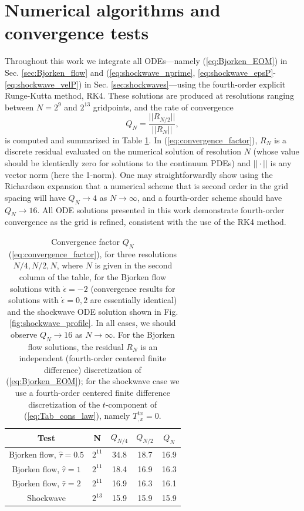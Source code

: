 \documentclass[%
notitlepage,
superscriptaddress,
nofootinbib,
amsmath,
amssymb,
aps,
twocolumn
]{revtex4-1}
\begin{document}
\section{Numerical algorithms and convergence tests} \label{sec:numerics}
Throughout this work we integrate all ODEs---namely (\ref{eq:Bjorken_EOM}) in Sec. \ref{sec:Bjorken_flow} and (\ref{eq:shockwave_nprime}, \ref{eq:shockwave_epsP}-\ref{eq:shockwave_velP}) in Sec. \ref{sec:shockwaves}---using the fourth-order explicit Runge-Kutta method, RK4.  These solutions are produced at resolutions ranging between $N = 2^{9}$ and $2^{13}$ gridpoints, and the rate of convergence
\begin{equation} \label{eq:convergence_factor}
Q_{N} = \frac{||R_{N/2}||}{||R_{N}||},
\end{equation}
is computed and summarized in Table \ref{table:ODE_conv}.  In (\ref{eq:convergence_factor}), $R_{N}$ is a discrete residual evaluated on the numerical solution of resolution $N$ (whose value should be identically zero for solutions to the continuum PDEs) and $||\cdot||$ is any vector norm (here the 1-norm).  One may straightforwardly show using the Richardson expansion that a numerical scheme that is second order in the grid spacing will have $Q_{N} \to 4$ as $N \to \infty$, and a fourth-order scheme should have $Q_{N} \to 16$.  All ODE solutions presented in this work demonstrate fourth-order convergence as the grid is refined, consistent with the use of the RK4 method.

\begin{table}[h]
\renewcommand{\arraystretch}{1.2}
\begin{tabular}{c || c | c | c | c}
Test & N & $Q_{N/4}$ & $Q_{N/2}$ & $Q_{N}$ \\ \hline \hline
Bjorken flow, $\hat{\tau} = 0.5$ & $2^{11}$ & 34.8 & 18.7 & 16.9 \\ 
Bjorken flow, $\hat{\tau} = 1$ & $2^{11}$   & 18.4 & 16.9 & 16.3   \\
Bjorken flow, $\hat{\tau} = 2$ & $2^{11}$   & 16.9 & 16.3 & 16.1   \\
Shockwave                      & $2^{13}$   & 15.9 & 15.9 & 15.9  \\
\end{tabular}
\caption{Convergence factor $Q_{N}$ (\ref{eq:convergence_factor}), for three resolutions $N/4, N/2, N$, where $N$ is given in the second column of the table, for the Bjorken flow solutions with $\dot{\epsilon} = -2$ (convergence results for solutions with $\dot{\epsilon} = 0, 2$ are essentially identical) and the shockwave ODE solution shown in Fig. \ref{fig:shockwave_profile}.  In all cases, we should observe $Q_{N} \to 16$ as $N \to \infty$.  For the Bjorken flow solutions, the residual $R_{N}$ is an independent (fourth-order centered finite difference) discretization of (\ref{eq:Bjorken_EOM}); for the shockwave case we use a fourth-order centered finite difference discretization of the $t$-component of (\ref{eq:Tab_cons_law}), namely $T^{tx}_{,x} = 0$.} \label{table:ODE_conv}
\end{table}
\end{document}

